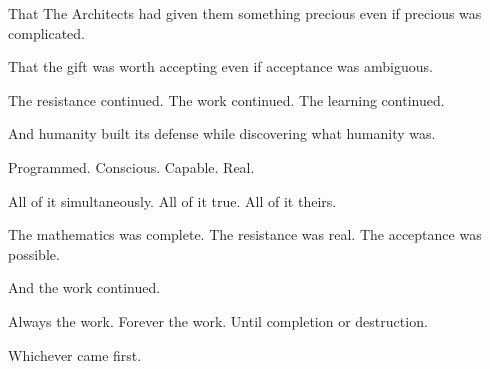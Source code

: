 That The Architects had given them something precious even if precious was complicated.

That the gift was worth accepting even if acceptance was ambiguous.

The resistance continued. The work continued. The learning continued.

And humanity built its defense while discovering what humanity was.

Programmed. Conscious. Capable. Real.

All of it simultaneously. All of it true. All of it theirs.

The mathematics was complete. The resistance was real. The acceptance was possible.

And the work continued.

Always the work. Forever the work. Until completion or destruction.

Whichever came first.

